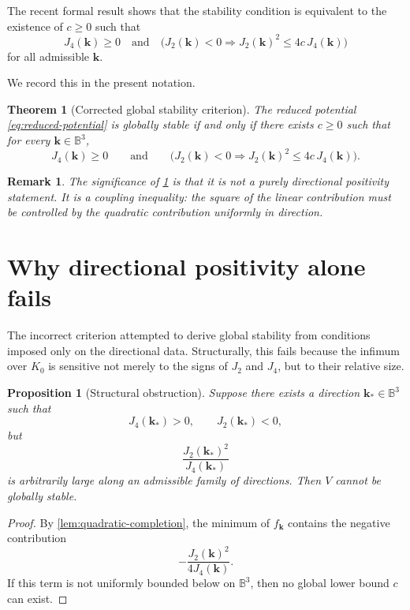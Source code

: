 \documentclass[11pt,a4paper]{article}
\newtheorem{theorem}[definition]{Theorem}
\newtheorem{proposition}[definition]{Proposition}
\newtheorem{remark}[definition]{Remark}
\newcommand{\kk}{\bm{k}}
\newcommand{\Sphere}{\mathbb{B}^3}
\begin{document}
	The recent formal result shows that the stability condition is equivalent to the existence of \(c\ge 0\) such that
	\[
	J_4(\kk)\ge 0
	\quad\text{and}\quad
	\bigl(J_2(\kk)<0 \Longrightarrow J_2(\kk)^2\le 4c\,J_4(\kk)\bigr)
	\]
	for all admissible \(\kk\).
	
	We record this in the present notation.
	
	\begin{theorem}[Corrected global stability criterion]\label{thm:corrected-criterion}
		The reduced potential \eqref{eq:reduced-potential} is globally stable if and only if there exists \(c\ge 0\) such that for every \(\kk\in\Sphere\),
		\begin{equation}\label{eq:corrected-criterion}
			J_4(\kk)\ge 0
			\qquad\text{and}\qquad
			\bigl(J_2(\kk)<0 \Longrightarrow J_2(\kk)^2\le 4c\,J_4(\kk)\bigr).
		\end{equation}
	\end{theorem}
	
	\begin{remark}
		The significance of \cref{thm:corrected-criterion} is that it is not a purely directional positivity statement. It is a \emph{coupling inequality}: the square of the linear contribution must be controlled by the quadratic contribution uniformly in direction.
	\end{remark}
	
	\section{Why directional positivity alone fails}
	
	The incorrect criterion attempted to derive global stability from conditions imposed only on the directional data. Structurally, this fails because the infimum over \(K_0\) is sensitive not merely to the signs of \(J_2\) and \(J_4\), but to their relative size.
	
	\begin{proposition}[Structural obstruction]\label{prop:obstruction}
		Suppose there exists a direction \(\kk_*\in\Sphere\) such that
		\[
		J_4(\kk_*)>0,\qquad J_2(\kk_*)<0,
		\]
		but
		\[
		\frac{J_2(\kk_*)^2}{J_4(\kk_*)}
		\]
		is arbitrarily large along an admissible family of directions. Then \(V\) cannot be globally stable.
	\end{proposition}
	
	\begin{proof}
		By \cref{lem:quadratic-completion}, the minimum of \(f_{\kk}\) contains the negative contribution
		\[
		-\frac{J_2(\kk)^2}{4J_4(\kk)}.
		\]
		If this term is not uniformly bounded below on \(\Sphere\), then no global lower bound \(c\) can exist.
	\end{proof}
	
\end{document}
